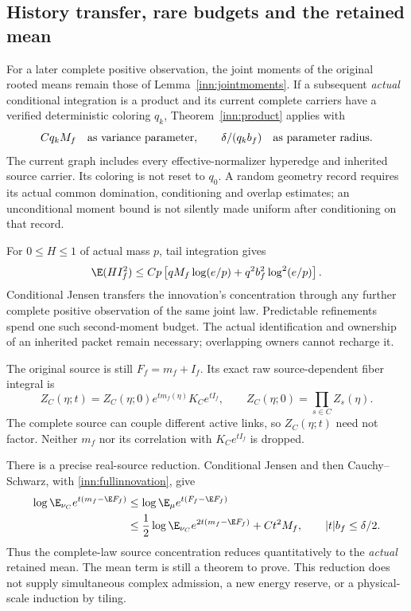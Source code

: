 \subsection{History transfer, rare budgets and the retained mean}

For a later complete positive observation, the joint moments of the original rooted means remain those of Lemma~\ref{inn:jointmoments}. If a subsequent \emph{actual} conditional integration is a product and its current complete carriers have a verified deterministic coloring $q_k$, Theorem~\ref{inn:product} applies with
\[
 Cq_kM_f\quad\hbox{as variance parameter},\qquad
 \delta/(q_kb_f)\quad\hbox{as parameter radius}.
\]
The current graph includes every effective-normalizer hyperedge and inherited source carrier. Its coloring is not reset to $q_0$. A random geometry record requires its actual common domination, conditioning and overlap estimates; an unconditional moment bound is not silently made uniform after conditioning on that record.

For $0\le H\le1$ of actual mass $p$, tail integration gives
\begin{equation}
 \E(HI_f^2)\le
 Cp\left[qM_f\log(e/p)+q^2b_f^2\log^2(e/p)\right].
 \label{inn:rareinnovation}
\end{equation}
Conditional Jensen transfers the innovation's concentration through any further complete positive observation of the same joint law. Predictable refinements spend one such second-moment budget. The actual identification and ownership of an inherited packet remain necessary; overlapping owners cannot recharge it.

The original source is still $F_f=m_f+I_f$. Its exact raw source-dependent fiber integral is
\begin{equation}
 Z_C(\eta;t)=Z_C(\eta;0)e^{t m_f(\eta)}K_Ce^{tI_f},
 \qquad Z_C(\eta;0)=\prod_{s\in C}Z_s(\eta).
 \label{inn:rawsource}
\end{equation}
The complete source can couple different active links, so $Z_C(\eta;t)$ need not factor. Neither $m_f$ nor its correlation with $K_Ce^{tI_f}$ is dropped.

There is a precise real-source reduction. Conditional Jensen and then Cauchy--Schwarz, with \eqref{inn:fullinnovation}, give
\begin{align}
 \log\E_{\nu_C}e^{t(m_f-\E F_f)}
 &\le\log\E_\mu e^{t(F_f-\E F_f)}\notag\\
 &\le\frac12\log\E_{\nu_C}e^{2t(m_f-\E F_f)}
           +Ct^2M_f,
 \qquad |t|b_f\le\delta/2.
 \label{inn:meanreduction}
\end{align}
Thus the complete-law source concentration reduces quantitatively to the \emph{actual} retained mean. The mean term is still a theorem to prove. This reduction does not supply simultaneous complex admission, a new energy reserve, or a physical-scale induction by tiling.
